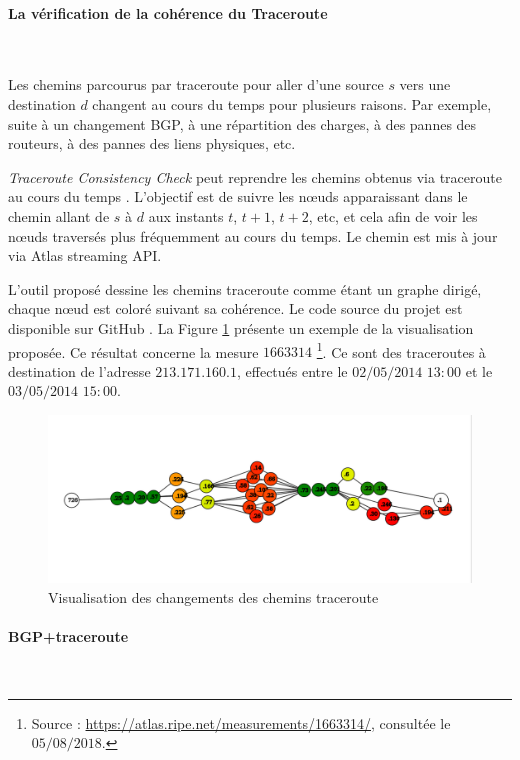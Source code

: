 \paragraph{La vérification de la cohérence du Traceroute}~

Les chemins parcourus par traceroute pour aller d'une source $s$ vers une destination $d$ changent au cours du temps pour plusieurs raisons. Par exemple, suite   à un changement BGP, à une  répartition des charges, à des pannes des routeurs,  à des pannes des liens physiques, etc.

\textit{Traceroute Consistency Check} peut reprendre les chemins obtenus via traceroute au cours du temps . L'objectif est de suivre les  n\oe{}uds apparaissant dans le chemin allant de  $s$ à $d$ aux instants $t$, $t+1$, $t+2$, etc, et cela afin de voir les n\oe{}uds traversés plus fréquemment au cours du temps. Le chemin est mis à jour via Atlas streaming API. 

L'outil proposé dessine les chemins traceroute comme étant un graphe dirigé, chaque n\oe{}ud est coloré suivant sa cohérence. Le code source du projet est disponible sur GitHub \cite{Traceroute-consistency-check}. La Figure \ref{fig:Traceroute-consistency-check} présente un exemple de la visualisation proposée. Ce résultat concerne la mesure $1663314$ \footnote{Source : \url{https://atlas.ripe.net/measurements/1663314/}, consultée le $05/08/2018$.}. Ce sont des traceroutes à destination de l'adresse $213.171.160.1$, effectués entre le $02/05/2014$ $13:00$ et le $03/05/2014$ $15:00$.

\begin{figure}[H]
	\centering
	\includegraphics[width=1\linewidth]{illustrations/traceroute-consitance.png}
	\caption{Visualisation des changements des chemins traceroute \cite{Traceroute-consistency-check}}
	\label{fig:Traceroute-consistency-check}
\end{figure}

\paragraph{BGP+traceroute} ~

